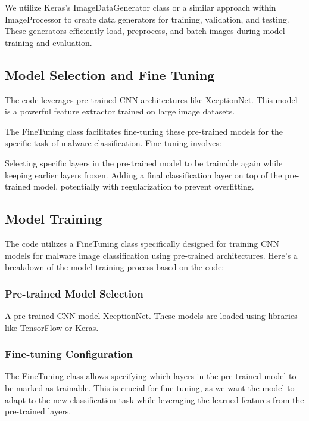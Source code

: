 \documentclass[conference]{IEEEtran}
\begin{document}
    We utilize Keras's ImageDataGenerator class or a similar approach within ImageProcessor to create data generators for training, validation, and testing. These generators efficiently load, preprocess, and batch images during model training and evaluation.

\subsection{Model Selection and Fine Tuning}

    The code leverages pre-trained CNN architectures like XceptionNet. This model is a  powerful feature extractor trained on large image datasets.
    
    The FineTuning class facilitates fine-tuning these pre-trained models for the specific task of malware classification. Fine-tuning involves: 

    Selecting specific layers in the pre-trained model to be trainable again while keeping earlier layers frozen.
    Adding a final classification layer on top of the pre-trained model, potentially with regularization to prevent overfitting.

\subsection{Model Training}
The code utilizes a FineTuning class specifically designed for training CNN models for malware image classification using pre-trained architectures. Here's a breakdown of the model training process based on the code:



\subsubsection{Pre-trained Model Selection}

    A pre-trained CNN model XceptionNet. These models are loaded using libraries like TensorFlow or Keras.

\subsubsection{Fine-tuning Configuration}

    The FineTuning class allows specifying which layers in the pre-trained model to be marked as trainable. This is crucial for fine-tuning, as we want the model to adapt to the new classification task while leveraging the learned features from the pre-trained layers.
\end{document}
